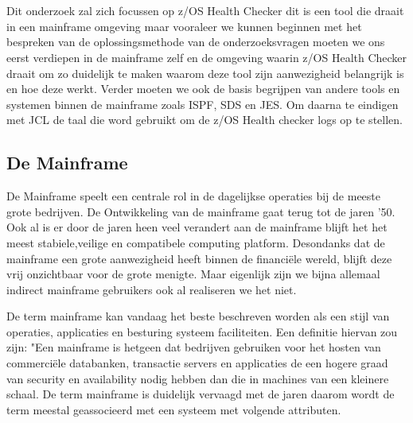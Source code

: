 \chapter{}
\label{ch:stand-van-zaken}



Dit onderzoek zal zich focussen op z/OS Health Checker dit is een tool die draait in een mainframe omgeving maar vooraleer we kunnen beginnen met het bespreken van de oplossingsmethode van de onderzoeksvragen moeten we ons eerst verdiepen in de mainframe zelf en de omgeving waarin z/OS Health Checker draait om zo duidelijk te maken waarom deze tool zijn aanwezigheid belangrijk is en hoe deze werkt. Verder moeten we ook de basis begrijpen van andere tools en systemen binnen de mainframe zoals ISPF, SDS en JES. Om daarna te eindigen met JCL de taal die word gebruikt om de z/OS Health checker logs op te stellen.

\section{De Mainframe}
\label{sec:De Mainframe}

De Mainframe speelt een centrale rol in de dagelijkse operaties bij de meeste grote bedrijven. De Ontwikkeling van de mainframe gaat terug tot de jaren '50. Ook al is er door de jaren heen veel verandert aan de mainframe blijft het het meest stabiele,veilige en compatibele computing platform. Desondanks dat de mainframe een grote aanwezigheid heeft binnen de financiële wereld, blijft deze vrij onzichtbaar voor de grote menigte. Maar eigenlijk zijn we bijna allemaal indirect mainframe gebruikers ook al realiseren we het niet. \cite{Ebbers2011}

De term mainframe kan vandaag het beste beschreven worden als een stijl van operaties, applicaties en besturing systeem faciliteiten. Een definitie hiervan zou zijn: "Een mainframe is hetgeen dat bedrijven gebruiken voor het hosten van commerciële databanken, transactie servers en applicaties de een hogere graad van security en availability nodig hebben dan die in machines van een kleinere schaal. 
De term mainframe is duidelijk vervaagd met de jaren daarom wordt de term meestal geassocieerd met een systeem met volgende attributen. \cite{Ebbers2011}


